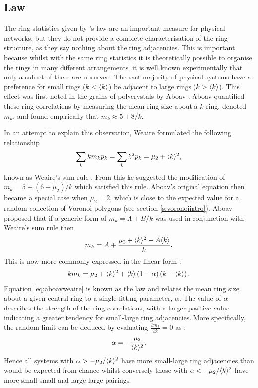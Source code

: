 \subsection{\aw{} Law}
\label{s:awlaw}

The ring statistics given by \lm's law are an important measure for physical networks, but they do not provide a complete characterisation of the ring structure, as they say nothing about the ring adjacencies. 
This is important because whilst with the same ring statistics it is theoretically possible to organise the rings in many different arrangements, it is well known experimentally that only a subset of these are observed.
The vast majority of physical systems have a preference for small rings ($k<\langle k \rangle$) be adjacent to large rings ($k>\langle k \rangle$).
This effect was first noted in the grains of polycrystals by Aboav \cite{Aboav1970}.
Aboav quantified these ring correlations by measuring the mean ring size about a $k$\--ring, denoted $m_k$, and found empirically that $m_k \approx 5 + 8/k$.

In an attempt to explain this observation, Weaire formulated the following relationship
\begin{equation}
	\label{eq:weairesumrule}
	\sum\limits_k km_kp_k = \sum\limits_k k^2p_k = \mu_2 + \langle k \rangle^2,
\end{equation}
known as Weaire's sum rule \cite{Weaire1974}.
From this he suggested the modification of $m_k=5+\left(6+\mu_2\right)/k$ which satisfied this rule.
Aboav's original equation then became a special case when $\mu_2=2$, which is close to the expected value for a random collection of Voronoi polygons (see section \ref{s:voronoiintro}).
Aboav proposed that if a generic form of $m_k = A + B/k$ was used in conjunction with Weaire's sum rule then
\begin{equation}
	m_k = A+\frac{\mu_2+\langle k \rangle^2-A\langle k \rangle}{k}.
\end{equation}
This is now more commonly expressed in the linear form \cite{Chiu1995}:
\begin{equation}
	\label{eq:aboavweaire}
	km_k = \mu_2+\langle k \rangle^2+\langle k \rangle\left(1-\alpha\right)\left(k-\langle k \rangle\right).
\end{equation}
Equation \ref{eq:aboavweaire} is known as the \aw{} law and relates the mean ring size about a given central ring to a single fitting parameter, $\alpha$.
The value of $\alpha$ describes the strength of the ring correlations, with a larger positive value indicating a greater tendency for small\--large ring adjacencies.
More specifically, the random limit can be deduced by evaluating $\frac{\partial{m_k}}{\partial{k}}=0$ as \cite{Delannay1994}:
\begin{equation}
	\label{eq:awrandlim}
	\alpha=-\frac{\mu_2}{\langle k \rangle^2}.
\end{equation}
Hence all systems with $\alpha>-\mu_2/\langle k \rangle^2$ have more small\--large ring  adjacencies than would be expected from chance whilst conversely those with $\alpha<-\mu_2/\langle k \rangle^2$ have more small\--small and large\--large pairings.


